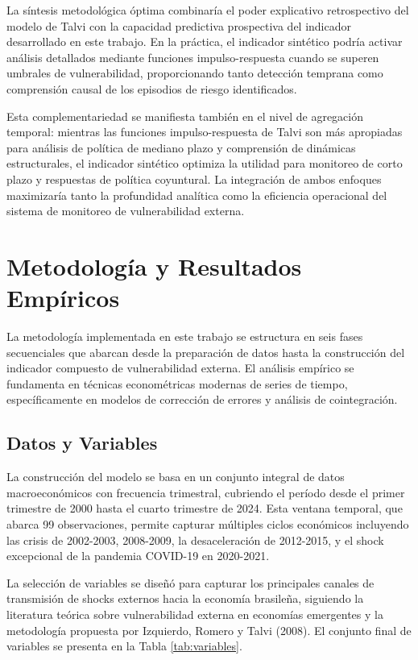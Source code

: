 \documentclass[3p,11pt]{elsarticle}
\begin{document}
La síntesis metodológica óptima combinaría el poder explicativo retrospectivo del modelo de Talvi con la capacidad predictiva prospectiva del indicador desarrollado en este trabajo. En la práctica, el indicador sintético podría activar análisis detallados mediante funciones impulso-respuesta cuando se superen umbrales de vulnerabilidad, proporcionando tanto detección temprana como comprensión causal de los episodios de riesgo identificados.

Esta complementariedad se manifiesta también en el nivel de agregación temporal: mientras las funciones impulso-respuesta de Talvi son más apropiadas para análisis de política de mediano plazo y comprensión de dinámicas estructurales, el indicador sintético optimiza la utilidad para monitoreo de corto plazo y respuestas de política coyuntural. La integración de ambos enfoques maximizaría tanto la profundidad analítica como la eficiencia operacional del sistema de monitoreo de vulnerabilidad externa.

\section{Metodología y Resultados Empíricos}

La metodología implementada en este trabajo se estructura en seis fases secuenciales que abarcan desde la preparación de datos hasta la construcción del indicador compuesto de vulnerabilidad externa. El análisis empírico se fundamenta en técnicas econométricas modernas de series de tiempo, específicamente en modelos de corrección de errores y análisis de cointegración.

\subsection{Datos y Variables}

La construcción del modelo se basa en un conjunto integral de datos macroeconómicos con frecuencia trimestral, cubriendo el período desde el primer trimestre de 2000 hasta el cuarto trimestre de 2024. Esta ventana temporal, que abarca 99 observaciones, permite capturar múltiples ciclos económicos incluyendo las crisis de 2002-2003, 2008-2009, la desaceleración de 2012-2015, y el shock excepcional de la pandemia COVID-19 en 2020-2021.

La selección de variables se diseñó para capturar los principales canales de transmisión de shocks externos hacia la economía brasileña, siguiendo la literatura teórica sobre vulnerabilidad externa en economías emergentes y la metodología propuesta por Izquierdo, Romero y Talvi (2008). El conjunto final de variables se presenta en la Tabla \ref{tab:variables}.
\end{document}
